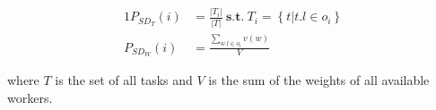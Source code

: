 \begin{alignat*}{1}
P_{SD_T}(i) &= \frac{|T_i|}{|T|} \ \mathbf{s.t.} \ T_i = \left\lbrace t | t.l \in o_i \right\rbrace \\
P_{SD_W}(i) &= \frac{\sum_{w.l \in o_i} v(w)}{V}
\end{alignat*}

\noindent where $T$ is the set of all tasks and $V$ is the sum of the weights of all available workers.\\





